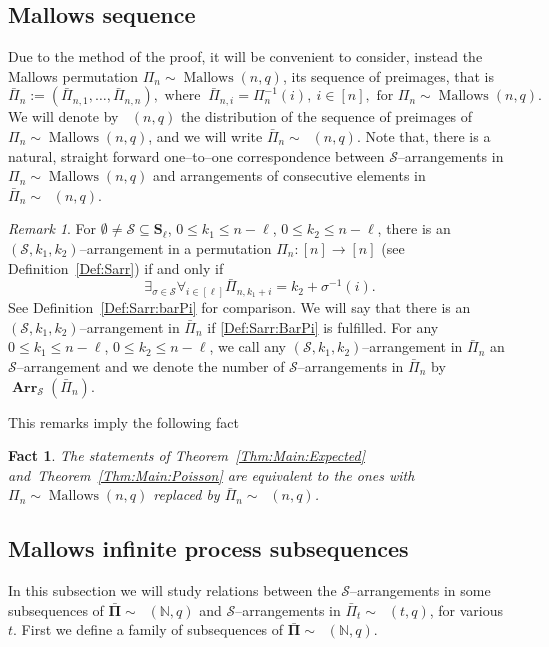 \documentclass[letterpaper,11pt]{article}
\newtheorem{fact}[theorem]{Fact}
\theoremstyle{definition}
\theoremstyle{remark}
\newtheorem{remark}[theorem]{Remark}
\renewcommand{\le}{\leqslant}
\DeclareMathOperator{\Mallow}{Mallows}
\DeclareMathOperator{\Mallows}{Mallows_{seq}}
\newcommand{\bN}{\mathbb{N}}
\newcommand{\bS}{\mathbf{S}}
\newcommand{\Arr}{\ensuremath{\operatorname{\mathbf{Arr}}}}
\newcommand{\barpi}{\bar \varPi}
\newcommand{\barPi}{\bar {\mathbf \Pi}}
\newcommand{\NN}{\mathbb{N}}
\newcommand{\cS}{\mathcal{S}}
\begin{document}
\subsection{Mallows sequence}

Due to the method of the proof, it will be convenient to consider,   instead the Mallows permutation $\varPi_n\sim \Mallow(n,q)$, its sequence of preimages, that is 
\[\barpi_n := (\barpi_{n,1},\ldots,\barpi_{n,n}),\text{ where }\ \barpi_{n,i}=\varPi_n^{-1}(i),\ i\in [n],\text{ for }\varPi_n\sim \Mallow(n,q).\]
We will denote by
$\Mallows(n,q)
$
the distribution of the sequence of preimages of $\varPi_n\sim \Mallow(n,q)$, and we will write  $\barpi_n\sim \Mallows(n,q)$. Note that,  there is a natural, straight forward one--to--one correspondence between $\cS$--arrangements  in $\varPi_n\sim \Mallow(n,q)$ and arrangements of consecutive elements  in $\barpi_n\sim\Mallows(n,q)$.  
\begin{remark}
	For $\emptyset\neq \cS\subseteq \bS_\ell$, $0\le k_1\le n-\ell$, $0\le k_2\le n-\ell$, there is an $(\cS,k_1,k_2)$--arrangement in a permutation $\varPi_n: [n]\to [n]$ (see Definition~\ref{Def:Sarr}) if and only if 
	\begin{equation}\label{Def:Sarr:BarPi}
		\exists_{\sigma\in\cS}\forall_{i\in [\ell]} \barpi_{n,k_1+i}=k_2+\sigma^{-1}(i).
	\end{equation}	
	See Definition~\ref{Def:Sarr:barPi} for comparison.
	We will say that there is an $(\cS,k_1,k_2)$--arrangement in $\barpi_n$ if \eqref{Def:Sarr:BarPi} is fulfilled. For any $0\le k_1\le n-\ell$, $0\le k_2\le n-\ell$, we call any $(\cS,k_1,k_2)$--arrangement in $\barpi_n$ an  $\cS$--arrangement and we denote  the number of $\cS$--arrangements in $\barpi_n$ by $\Arr_{\cS}(\barpi_n)$.  
\end{remark}
This remarks imply the following fact
\begin{fact}\label{Rem:Perm:Seq}
	The statements of Theorem~\ref{Thm:Main:Expected} and~Theorem~\ref{Thm:Main:Poisson} are equivalent to the ones with $\varPi_n\sim\Mallow(n,q)$ replaced by $\barpi_n\sim\Mallows(n,q)$.
\end{fact}


\subsection{Mallows infinite process subsequences}


In this subsection we will study relations between the $\cS$--arrangements in some subsequences of $\barPi\sim\Mallows(\bN,q)$ and $\cS$--arrangements in $\barpi_t\sim\Mallows(t,q)$, for various $t$. 
First we define a family of subsequences of  $\barPi\sim\Mallows(\NN,q)$. 
\end{document}
